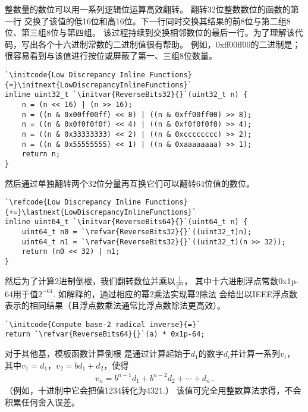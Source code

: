 整数量的数位可以用一系列逻辑位运算高效翻转。
翻转32位整数数位的函数的第一行
交换了该值的低16位和高16位。下一行同时交换其结果的前8位与第二组8位、第三组8位与第四组。
该过程持续到交换相邻数位的最后一行。为了理解该代码，写出各个十六进制常数的二进制值很有帮助。
例如，{\ttfamily 0xff00ff00}的二进制是{}；
很容易看到与该值进行按位或屏蔽了第一、三组8位数量。
\begin{lstlisting}
`\initcode{Low Discrepancy Inline Functions}{=}\initnext{LowDiscrepancyInlineFunctions}`
inline uint32_t `\initvar{ReverseBits32}{}`(uint32_t n) {
    n = (n << 16) | (n >> 16);
    n = ((n & 0x00ff00ff) << 8) | ((n & 0xff00ff00) >> 8);
    n = ((n & 0x0f0f0f0f) << 4) | ((n & 0xf0f0f0f0) >> 4);
    n = ((n & 0x33333333) << 2) | ((n & 0xcccccccc) >> 2);
    n = ((n & 0x55555555) << 1) | ((n & 0xaaaaaaaa) >> 1);
    return n;
}
\end{lstlisting}

然后通过单独翻转两个32位分量再互换它们可以翻转64位值的数位。
\begin{lstlisting}
`\refcode{Low Discrepancy Inline Functions}{+=}\lastnext{LowDiscrepancyInlineFunctions}`
inline uint64_t `\initvar{ReverseBits64}{}`(uint64_t n) {
    uint64_t n0 = `\refvar{ReverseBits32}{}`((uint32_t)n);
    uint64_t n1 = `\refvar{ReverseBits32}{}`((uint32_t)(n >> 32));
    return (n0 << 32) | n1;
}
\end{lstlisting}

然后为了计算2进制倒根，我们翻转数位并乘以$\displaystyle\frac{1}{2^{64}}$，
其中十六进制浮点常数{\ttfamily 0x1p-64}用于值$2^{-64}$.
如解释的，通过相应的幂2乘法实现幂2除法
会给出以IEEE浮点数表示的相同结果（且浮点数乘法通常比浮点数除法更高效）。
\begin{lstlisting}
`\initcode{Compute base-2 radical inverse}{=}`
return `\refvar{ReverseBits64}{}`(a) * 0x1p-64;
\end{lstlisting}

对于其他基，模板函数计算倒根
是通过计算起始于$d_1$的数字$d_i$并计算一系列$v_i$，
其中$v_1=d_1$，$v_2=bd_1+d_2$，使得
\begin{align*}
    v_n=b^{n-1}d_1+b^{n-2}d_2+\cdots+d_n\, .
\end{align*}
（例如，十进制中它会把值1234转化为4321.）
该值可完全用整数算法求得，不会积累任何舍入误差。

